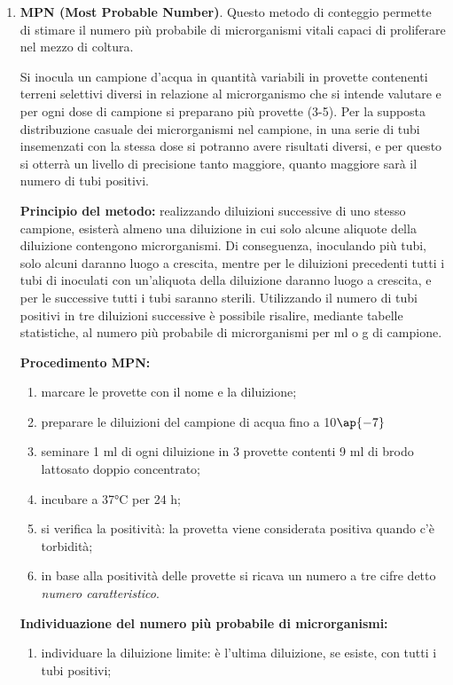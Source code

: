 \documentclass[11pt]{book}
\begin{document}
\begin{itemize}
\begin{enumerate}
\clearpage
\item \textbf{MPN (Most Probable Number)}. Questo metodo di conteggio permette di stimare il numero più probabile di microrganismi vitali capaci di proliferare nel mezzo di coltura.

Si inocula un campione d’acqua in quantità variabili in provette contenenti terreni selettivi diversi in relazione al microrganismo che si intende valutare e per ogni dose di campione si preparano più provette (3-5).
Per la supposta distribuzione casuale dei microrganismi nel campione, in una serie di tubi insemenzati con la stessa dose si potranno avere risultati diversi, e per questo si otterrà un livello di precisione tanto maggiore, quanto maggiore sarà il numero di tubi positivi.

\textbf{Principio del metodo:} realizzando diluizioni successive di uno stesso campione, esisterà almeno una diluizione in cui solo alcune aliquote della diluizione contengono microrganismi. Di conseguenza, inoculando più tubi, solo alcuni daranno luogo a crescita, mentre per le diluizioni precedenti tutti i tubi di inoculati con un’aliquota della diluizione daranno luogo a crescita, e per le successive tutti i tubi saranno sterili. Utilizzando il numero di tubi positivi in tre diluizioni successive è possibile risalire, mediante tabelle statistiche, al numero più probabile di microrganismi per ml o g di campione.

\textbf{Procedimento MPN:}
\begin{enumerate}
\item marcare le provette con il nome e la diluizione;
\item preparare le diluizioni del campione di acqua fino a 10$\ap{-7}$
\item seminare 1 ml di ogni diluizione in 3 provette contenti 9 ml di brodo lattosato doppio concentrato;
\item incubare a 37°C per 24 h;
\item si verifica la positività: la provetta viene considerata positiva quando c’è torbidità;
\item in base alla positività delle provette si ricava un numero a tre cifre detto \emph{numero caratteristico}.
\end{enumerate}

\textbf{Individuazione del numero più probabile di microrganismi:}
\begin{enumerate}
\item individuare la diluizione limite: è l’ultima diluizione, se esiste, con tutti i tubi positivi;


\end{enumerate}
\end{enumerate}
\end{itemize}
\end{document}
